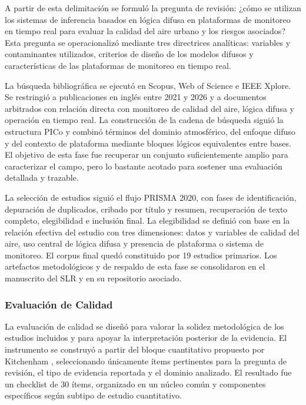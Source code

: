A partir de esta delimitación se formuló la pregunta de revisión: ¿cómo se utilizan los sistemas de inferencia basados en lógica difusa en plataformas de monitoreo en tiempo real para evaluar la calidad del aire urbano y los riesgos asociados? Esta pregunta se operacionalizó mediante tres directrices analíticas: variables y contaminantes utilizados, criterios de diseño de los modelos difusos y características de las plataformas de monitoreo en tiempo real.

La búsqueda bibliográfica se ejecutó en Scopus, Web of Science e IEEE Xplore. Se restringió a publicaciones en inglés entre 2021 y 2026 y a documentos arbitrados con relación directa con monitoreo de calidad del aire, lógica difusa y operación en tiempo real. La construcción de la cadena de búsqueda siguió la estructura PICo y combinó términos del dominio atmosférico, del enfoque difuso y del contexto de plataforma mediante bloques lógicos equivalentes entre bases. El objetivo de esta fase fue recuperar un conjunto suficientemente amplio para caracterizar el campo, pero lo bastante acotado para sostener una evaluación detallada y trazable.

La selección de estudios siguió el flujo PRISMA 2020, con fases de identificación, depuración de duplicados, cribado por título y resumen, recuperación de texto completo, elegibilidad e inclusión final. La elegibilidad se definió con base en la relación efectiva del estudio con tres dimensiones: datos y variables de calidad del aire, uso central de lógica difusa y presencia de plataforma o sistema de monitoreo. El corpus final quedó constituido por 19 estudios primarios. Los artefactos metodológicos y de respaldo de esta fase se consolidaron en el manuscrito del SLR y en su repositorio asociado.

\subsubsection{Evaluación de Calidad}
La evaluación de calidad se diseñó para valorar la solidez metodológica de los estudios incluidos y para apoyar la interpretación posterior de la evidencia. El instrumento se construyó a partir del bloque cuantitativo propuesto por Kitchenham \cite{kitchenham2007}, seleccionando únicamente ítems pertinentes para la pregunta de revisión, el tipo de evidencia reportada y el dominio analizado. El resultado fue un checklist de 30 ítems, organizado en un núcleo común y componentes específicos según subtipo de estudio cuantitativo.


